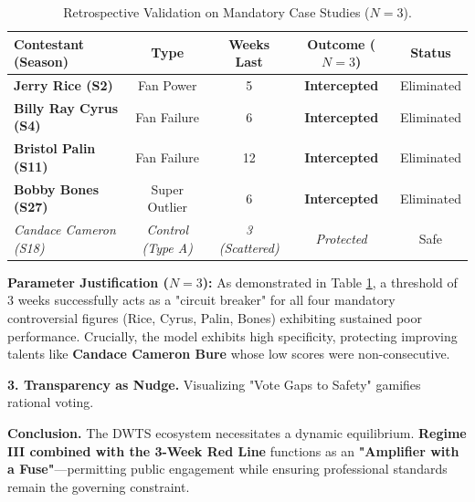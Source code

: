 \documentclass{mcmthesis}
\begin{document}
\vspace{-0.8em}
\begin{table}[h]
	\centering
	\small
	\caption{Retrospective Validation on Mandatory Case Studies ($N=3$).}
	\vspace{-0.5em}
	\begin{tabular}{lcccc}
		\toprule
		\textbf{Contestant (Season)} & \textbf{Type} & \textbf{Weeks Last} & \textbf{Outcome ($N=3$)} & \textbf{Status} \\
		\midrule
		\textbf{Jerry Rice (S2)} & Fan Power & 5 & \textbf{Intercepted} & Eliminated \\
		\textbf{Billy Ray Cyrus (S4)} & Fan Failure & 6 & \textbf{Intercepted} & Eliminated \\
		\textbf{Bristol Palin (S11)} & Fan Failure & 12 & \textbf{Intercepted} & Eliminated \\
		\textbf{Bobby Bones (S27)} & Super Outlier & 6 & \textbf{Intercepted} & Eliminated \\
		\textit{Candace Cameron (S18)} & \textit{Control (Type A)} & \textit{3 (Scattered)} & \textit{Protected} & Safe \\
		\bottomrule
	\end{tabular}
	\label{tab:red_line_validation}
\end{table}
\vspace{-0.5em}

\noindent \textbf{Parameter Justification ($N=3$):} As demonstrated in Table \ref{tab:red_line_validation}, a threshold of 3 weeks successfully acts as a "circuit breaker" for all four mandatory controversial figures (Rice, Cyrus, Palin, Bones) exhibiting sustained poor performance. Crucially, the model exhibits high specificity, protecting improving talents like \textbf{Candace Cameron Bure} whose low scores were non-consecutive.

\noindent \textbf{3. Transparency as Nudge.} Visualizing "Vote Gaps to Safety" gamifies rational voting.

\vspace{0.5em}
\noindent \textbf{Conclusion.} The DWTS ecosystem necessitates a dynamic equilibrium. \textbf{Regime III combined with the 3-Week Red Line} functions as an \textbf{"Amplifier with a Fuse"}—permitting public engagement while ensuring professional standards remain the governing constraint.



\end{document}
